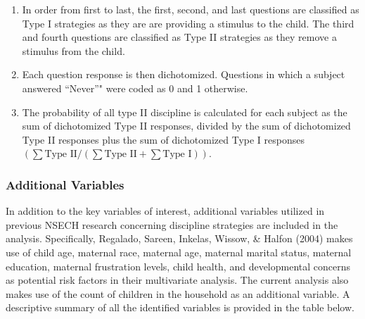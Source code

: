 \documentclass[]{elsarticle}
\begin{document}
\begin{enumerate}
\def\labelenumi{\arabic{enumi}.}
\itemsep1pt\parskip0pt
\item
  In order from first to last, the first, second, and last questions are
  classified as Type I strategies as they are are providing a stimulus
  to the child. The third and fourth questions are classified as Type II
  strategies as they remove a stimulus from the child.
\item
  Each question response is then dichotomized. Questions in which a
  subject answered ``Never''" were coded as 0 and 1 otherwise.
\item
  The probability of all type II discipline is calculated for each
  subject as the sum of dichotomized Type II responses, divided by the
  sum of dichotomized Type II responses plus the sum of dichotomized
  Type I responses
  $(\sum\text{Type II}/(\sum\text{Type II} + \sum\text{Type I}))$.
\end{enumerate}

\subsubsection{Additional Variables}\label{additional-variables}

In addition to the key variables of interest, additional variables
utilized in previous NSECH research concerning discipline strategies are
included in the analysis. Specifically, Regalado, Sareen, Inkelas,
Wissow, \& Halfon (2004) makes use of child age, maternal race, maternal
age, maternal marital status, maternal education, maternal frustration
levels, child health, and developmental concerns as potential risk
factors in their multivariate analysis. The current analysis also makes
use of the count of children in the household as an additional variable.
A descriptive summary of all the identified variables is provided in the
table below.
\end{document}
